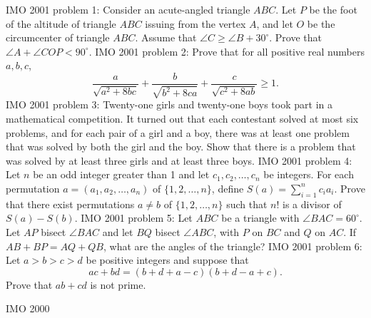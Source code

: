 IMO 2001 problem 1:  Consider an acute-angled triangle $ABC$. Let $P$ be the foot of the altitude of triangle $ABC$ issuing from the vertex $A$, and let $O$ be the circumcenter of triangle $ABC$. Assume that $\angle C \geq \angle B+30^{\circ}$. Prove that $\angle A+\angle COP < 90^{\circ}$. 
IMO 2001 problem 2:  Prove that for all positive real numbers $a,b,c$,
\[ \frac{a}{\sqrt{a^2 + 8bc}} + \frac{b}{\sqrt{b^2 + 8ca}} + \frac{c}{\sqrt{c^2 + 8ab}} \geq 1. \] 
IMO 2001 problem 3:  Twenty-one girls and twenty-one boys took part in a mathematical competition. It turned out that each contestant solved at most six problems, and for each pair of a girl and a boy, there was at least one problem that was solved by both the girl and the boy. Show that there is a problem that was solved by at least three girls and at least three boys. 
IMO 2001 problem 4:  Let $n$ be an odd integer greater than 1 and let $c_1, c_2, \ldots, c_n$ be integers. For each permutation $a = (a_1, a_2, \ldots, a_n)$ of $\{1,2,\ldots,n\}$, define $S(a) = \sum_{i=1}^n c_i a_i$. Prove that there exist permutations $a \neq b$ of $\{1,2,\ldots,n\}$ such that $n!$ is a divisor of $S(a)-S(b)$. 
IMO 2001 problem 5:  Let $ABC$ be a triangle with $\angle BAC = 60^{\circ}$. Let $AP$ bisect $\angle BAC$ and let $BQ$ bisect  $\angle ABC$, with $P$ on $BC$ and $Q$ on $AC$. If $AB + BP = AQ + QB$, what are the angles of the triangle? 
IMO 2001 problem 6:  Let $a > b > c > d$ be positive integers and suppose that
\[ ac + bd = (b+d+a-c)(b+d-a+c). \]
Prove that $ab + cd$ is not prime. 

IMO 2000 

